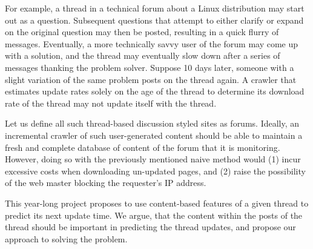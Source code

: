  For example, a thread in a technical forum about a Linux distribution may start 
out as a question. Subsequent questions that attempt to either clarify or expand 
on the original question may then be posted, resulting in a quick flurry of 
messages. Eventually, a more technically savvy user of the forum may come up 
with a solution, and the thread may eventually slow down after a series of 
messages thanking the problem solver. Suppose 10 days later, someone with a 
slight variation of the same problem posts on the thread again. A crawler that 
estimates update rates solely on the age of the thread to determine its download 
rate of the thread may not update itself with the thread.

 Let us define all such thread-based discussion styled sites as forums. Ideally, 
an incremental crawler of such user-generated content should be able to maintain 
a fresh and complete database of content of the forum that it is monitoring.  
However, doing so with the previously mentioned naive method would (1) incur 
excessive costs when downloading un-updated pages, and (2) raise the possibility 
of the web master blocking the requester's IP address.

 This year-long project proposes to use content-based features of a given thread 
to predict its next update time. We argue, that the content within the posts of 
the thread should be important in predicting the thread updates, and propose our 
approach to solving the problem.

